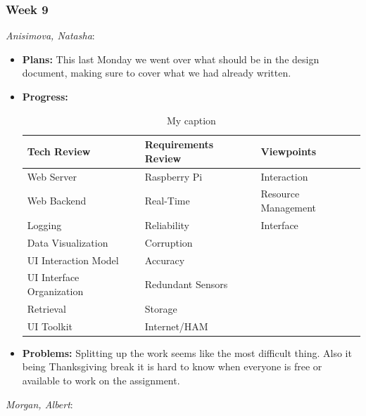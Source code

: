 \documentclass[10pt,draftclsnofoot,onecolumn]{IEEEtran}
\newcommand{\subsubsubsection}[1]{
	\hfill\break\textit{#1}:
}
\begin{document}
\subsubsection{Week 9}
\subsubsubsection{Anisimova, Natasha}
\begin{itemize}
	\item \textbf{Plans: }
	This last Monday we went over what should be in the design document, making sure to cover what we had already written.
	\item \textbf{Progress: }
	\begin{table}[htbp!]
		\centering
		\caption{My caption}
		\label{my-label}
		\begin{tabular}{lll}
			\hline
			\multicolumn{1}{|l|}{Tech Review} & \multicolumn{1}{l|}{Requirements Review} & \multicolumn{1}{l|}{Viewpoints}  \\ \hline
			\multicolumn{1}{|l|}{Web Server}  & \multicolumn{1}{l|}{Raspberry Pi}        & \multicolumn{1}{l|}{Interaction} \\ \hline
			Web Backend                       & Real-Time                                & Resource Management              \\
			Logging                           & Reliability                              & Interface                        \\
			Data Visualization                & Corruption                               &                                  \\
			UI Interaction Model              & Accuracy                                 &                                  \\
			UI Interface Organization         & Redundant Sensors                        &                                  \\
			Retrieval                         & Storage                                  &                                  \\
			UI Toolkit                        & Internet/HAM                             &
		\end{tabular}
	\end{table}

	\item \textbf{Problems: }
	Splitting up the work seems like the most difficult thing. Also it being Thanksgiving break it is hard to know when everyone is free or available to work on the assignment.
\end{itemize}
\subsubsubsection{Morgan, Albert}
\end{document}
